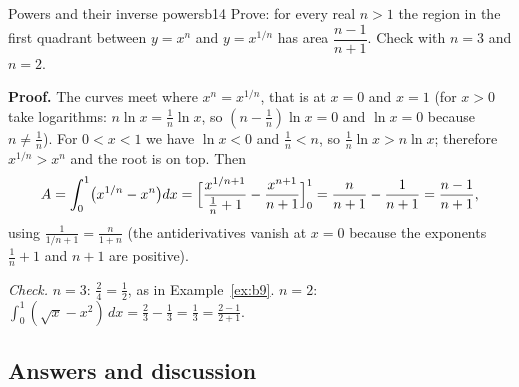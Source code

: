 \documentclass[11pt]{article}
\begin{document}
\begin{exmp}{Powers and their inverse powers}{b14}
Prove: for every real $n>1$ the region in the first quadrant between $y=x^n$ and $y=x^{1/n}$ has area $\dfrac{n-1}{n+1}$. Check with $n=3$ and $n=2$.

\textbf{Proof.} The curves meet where $x^n=x^{1/n}$, that is at $x=0$ and $x=1$ (for $x>0$ take logarithms: $n\ln x=\frac1n\ln x$, so $\left(n-\frac1n\right)\ln x=0$ and $\ln x=0$ because $n\ne\frac1n$). For $0<x<1$ we have $\ln x<0$ and $\frac1n<n$, so $\frac1n\ln x>n\ln x$; therefore $x^{1/n}>x^n$ and the root is on top. Then
\[
A=\int_0^1\bigl(x^{1/n}-x^n\bigr)dx=\Bigl[\frac{x^{1/n+1}}{\frac1n+1}-\frac{x^{n+1}}{n+1}\Bigr]_0^1=\frac{n}{n+1}-\frac1{n+1}=\frac{n-1}{n+1},
\]
using $\frac1{1/n+1}=\frac n{1+n}$ (the antiderivatives vanish at $x=0$ because the exponents $\frac1n+1$ and $n+1$ are positive).

\emph{Check.} $n=3$: $\frac24=\frac12$, as in Example~\ref{ex:b9}. $n=2$: $\int_0^1(\sqrt x-x^2)\,dx=\frac23-\frac13=\frac13=\frac{2-1}{2+1}$. \checkmark
\end{exmp}

\subsection*{Answers and discussion}
\end{document}
